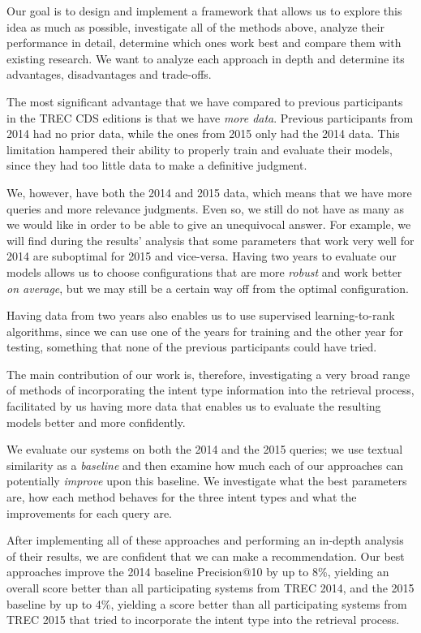 Our goal is to design and implement a framework that allows us
to explore this idea as much as possible, investigate all of the methods above,
analyze their performance in detail,
determine which ones work best and compare them with existing research.
We want to analyze each approach in depth and determine its advantages, disadvantages and trade-offs.

The most significant advantage that we have compared to previous participants in the TREC CDS editions is
that we have \emph{more data}. Previous participants from 2014 had no prior data, while the ones from 2015
only had the 2014 data. This limitation hampered their ability to properly train and evaluate their models, since they
had too little data to make a definitive judgment.

We, however, have both the 2014 and 2015 data, which means that
we have more queries and more relevance judgments.
Even so, we still do not have as many as we would like in order to be able to give an unequivocal answer.
For example, we will find during the results' analysis
that some parameters that work very well for 2014 are suboptimal for 2015 and vice-versa.
Having two
years to evaluate our models allows us to choose configurations that are more \emph{robust} and work better \emph{on average}, but we
may still be a certain way off from the optimal configuration.

Having data from two years also
enables us to use supervised learning-to-rank algorithms,
since we can use one of the years for training and the other year for testing,
something that none of the previous participants could have tried.

The main contribution of our work is, therefore, investigating a very broad range of methods of incorporating
the intent type information into the retrieval process,
facilitated by us having more data that enables us to evaluate the resulting models better and more confidently.

We evaluate our systems on both the 2014 and the 2015 queries; we use textual similarity
as a \emph{baseline} and then examine how much each of our approaches can potentially \emph{improve} upon this baseline.
We investigate what the best parameters are, how each method behaves for the three
intent types and what the improvements for each query are.

After implementing all of these approaches and performing an in-depth analysis of their results,
we are confident that we can make a recommendation.
Our best approaches improve the 2014 baseline Precision@10 by up to 8\%, yielding an overall
score better than all participating systems from TREC 2014,
and the 2015 baseline by up to 4\%, yielding a score better than all participating
systems from TREC 2015 that tried to incorporate the intent
type into the retrieval process.

